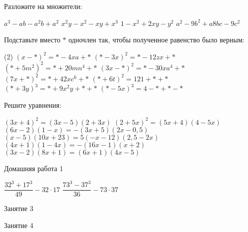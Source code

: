 \begin{class}[number=2]
	\begin{listofex}
		\item Разложите на множители: %
		\begin{tasks}
			\task \( a^3-ab-a^2b+a^2 \)
			\task \( x^2y-x^2-xy+x^3 \)
			\task \( 1-x^2+2xy-y^2 \)
			\task \( a^2-9b^2+a8bc-9c^2 \)
		\end{tasks}
		\item Подставьте вместо \(*\) одночлен так, чтобы полученное равенство было верным: %
		\begin{tasks}(2)
			\task \( (x-*)^2=*-4xa+* \)
			\task \( (*-3x)^2=*-12zx+* \)
			\task \( (*+5m^2)^2=*+20mn^4+* \)
			\task \( (3x-*)^2=*-30xa^4+* \)
			\task \( (7x+*)^2=*+42xc^6+* \)
			\task \( (*+6t)^2=121+*+* \)
			\task \( (*+3y)^3=*+9x^2y+*+*\)
			\task \( (*-5x)^3=4-*+*-* \)
		\end{tasks}
		\item Решите уравнения:
		\begin{tasks}
			\task \( (3x+4)^2=(3x-5)(2+3x) \)
			\task \( (2+5x)^2=(5x+4)(4-5x) \)
			\task \( (6x-2)(1-x)=-(3x+5)(2x-0,5) \)
			\task \( (x-5)(10x+23)=5(-x-12)(2,5-2x) \)
			\task \( (4x+1)(1-4x)=-(16x-1)(x+2) \)
			\task \( (3x-2)(8x+1)=(6x+1)(4x-5) \)
		\end{tasks}
	\end{listofex}
\end{class}

\begin{homework}[number=1]
	\begin{listofex}
		\item Домашняя работа 1
		\begin{tasks}
			\task \( \dfrac{ 32^3+17^3 }{ 49 }-32\cdot17 \)
			\task \( \dfrac{ 73^3-37^3 }{ 36 }-73\cdot37 \)
		\end{tasks}
	\end{listofex}
\end{homework}

\begin{class}[number=3]
	\begin{listofex}
		\item Занятие 3 
	\end{listofex}
\end{class}

\begin{class}[number=4]
	\begin{listofex}
		\item Занятие 4
	\end{listofex}
\end{class}

